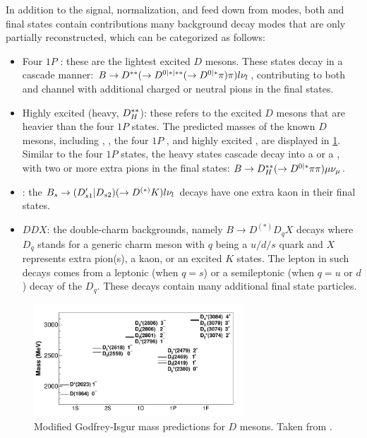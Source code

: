 In addition to the signal, normalization, and feed down from \Dstar modes,
both \Dstarp\mun and \Dz\mun final states contain contributions many
background decay modes that are only partially reconstructed,
which can be categorized as follows:
\begin{itemize}
    \item Four $1P$ \Dstst:
        these are the lightest excited $D$ mesons.
        These \Dstst states decay in a cascade manner:
        $B \rightarrow D^{**}
        (\rightarrow D^{0|*|**} (\rightarrow D^{0|*}\pi) \pi)
        l{{\nu}_l}$,
        contributing to both \Dz and \Dstar channel with additional
        charged or neutral pions in the final states.
    \item Highly excited \Dstst (\Dstst heavy, $D^{**}_H$):
        these refers to the excited $D$ mesons that are heavier than the four
        $1P$ \Dstst states.
        The predicted masses of
        the known $D$ mesons, including \Dz, \Dstar, the four $1P$ \Dstst,
        and highly excited \Dstst,
        are displayed in \cref{fig:excited-d-meson}.
        Similar to the four $1P$ \Dstst states,
        the \Dstst heavy states cascade decay into a \Dz or a \Dstar,
        with two or more extra pions in the final states:
        $B \rightarrow D^{**}_H (\rightarrow D^{0|*} \pi\pi) \mu{\ensuremath{{\nu}_\mu}}$.
    \item \DststS:
        the $B_s \rightarrow (D'_{s1}|D_{s2})
        (\rightarrow D^{(*)}K) l{{\nu}_l}$
        decays have one extra kaon in their final states.
    \item $DDX$:
        the double-charm backgrounds,
        namely $B \rightarrow D^{(*)} D_q X$ decays
        where $D_q$ stands for a generic charm meson with $q$ being a
        $u/d/s$ quark and $X$ represents extra pion(s), a kaon, or an
        excited $K$ states.
        The lepton in such decays comes from
        a leptonic (when $q = s$) or a semileptonic
        (when $q = u \text{ or } d$) decay of the $D_q$.
        These decays contain many additional final state particles.
\end{itemize}

\begin{figure}[!htb]
    \centering
    \includegraphics[width=0.7\textwidth]{figs-analysis-overview/d_meson_predicted_masses.pdf}
    \caption{
        Modified Godfrey-Isgur mass predictions for $D$ mesons.
        Taken from \cite{D_mesons_2013}.
    }
    \label{fig:excited-d-meson}
\end{figure}


